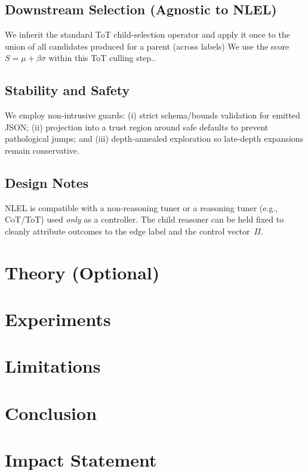 \documentclass{article}
\theoremstyle{plain}
\theoremstyle{definition}
\theoremstyle{remark}
\begin{document}
\subsection{Downstream Selection (Agnostic to NLEL)}
We inherit the standard ToT child-selection operator and apply it once to the union of all candidates produced for a parent (across labels) We use the score $S=\mu+\beta\sigma$ within this ToT culling step..
\subsection{Stability and Safety}
We employ non-intrusive guards: (i) strict schema/bounds validation for emitted JSON; (ii) projection into a trust region around safe defaults to prevent pathological jumps; and (iii) depth-annealed exploration so late-depth expansions remain conservative.

\subsection{Design Notes}
NLEL is compatible with a non-reasoning tuner or a reasoning tuner (e.g., CoT/ToT) used \emph{only} as a controller. The child reasoner can be held fixed to cleanly attribute outcomes to the edge label and the control vector~$\Pi$.

\section{Theory (Optional)}

\section{Experiments}

\section{Limitations}

\section{Conclusion}

\section*{Impact Statement}
\end{document}
